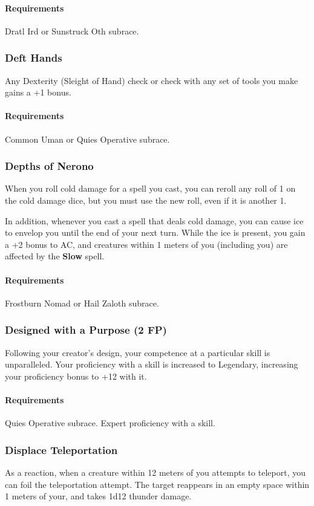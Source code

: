     \paragraph{Requirements} Dratl Ird or Sunstruck Oth subrace.
\subsubsection{Deft Hands} \label{feat::defthands}
    Any Dexterity (Sleight of Hand) check or check with any set of tools you make gains a +1 bonus.
    \paragraph{Requirements} Common Uman or Quies Operative subrace.
\subsubsection{Depths of Nerono} \label{feat::depthsofnerono}
    When you roll cold damage for a spell you cast, you can reroll any roll of 1 on the cold damage dice, but you must use the new roll, even if it is another 1.

    In addition, whenever you cast a spell that deals cold damage, you can cause ice to envelop you until the end of your next turn.
    While the ice is present, you gain a +2 bonus to AC, and creatures within 1 meters of you (including you) are affected by the \textbf{Slow} spell.
    \paragraph{Requirements} Frostburn Nomad or Hail Zaloth subrace.
\subsubsection{Designed with a Purpose (2 FP)} \label{feat::designedwithapurpose}
    Following your creator's design, your competence at a particular skill is unparalleled.
    Your proficiency with a skill is increased to Legendary, increasing your proficiency bonus to +12 with it.
    \paragraph{Requirements} Quies Operative subrace. Expert proficiency with a skill.
\subsubsection{Displace Teleportation} \label{feat::displaceteleportation}
    As a reaction, when a creature within 12 meters of you attempts to teleport, you can foil the teleportation attempt.
    The target reappears in an empty space within 1 meters of your, and takes 1d12 thunder damage.
